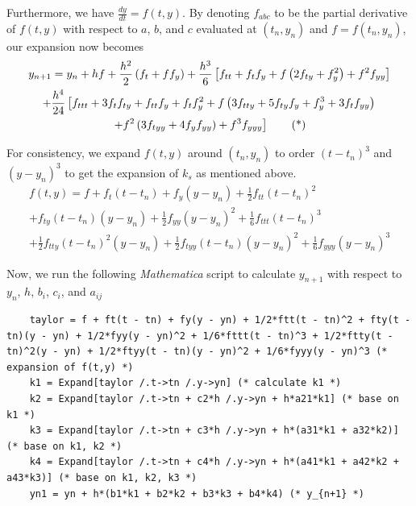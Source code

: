 \documentclass[a4paper]{article}
\numberwithin{equation}{section}
\begin{document}
Furthermore, we have \(\frac{dy}{dt} = f(t,y)\). By denoting \(f_{abc}\) to be the partial derivative of \(f(t,y)\) with respect to \(a\), \(b\), and \(c\) evaluated at \((t_n, y_n)\) and \(f = f(t_n, y_n)\), our expansion now becomes
\begin{multline*}
  y_{n+1} = y_n + hf + \frac{h^2}{2}\left(f_t + f f_y\right) + \frac{h^3}{6}\left[f_{tt} + f_t f_y + f\left(2f_{ty} + f_y^2\right) + f^2 f_{yy}\right] \\
  + \frac{h^4}{24}\left[f_{ttt} + 3f_t f_{ty} + f_{tt} f_y + f_t f_y^2 + f\left(3f_{tty} + 5f_{ty} f_y + f_y^3 + 3f_t f_{yy}\right)\right.     \\
    \left.+ f^2\left(3f_{tyy} + 4f_y f_{yy}\right) + f^3 f_{yyy}\vphantom{f_y^3}\right] \tag{*}
\end{multline*}

For consistency, we expand \(f(t,y)\) around \((t_n, y_n)\) to order \({(t-t_n)}^3\) and \({(y-y_n)}^3\) to get the expansion of \(k_s\) as mentioned above.
\begin{multline*}
  f(t,y) = f + f_t(t-t_n) + f_y(y-y_n) + \frac{1}{2}f_{tt}{(t-t_n)}^2 \\
  + f_{ty}(t-t_n)(y-y_n) + \frac{1}{2}f_{yy}{(y-y_n)}^2 + \frac{1}{6}f_{ttt}{(t-t_n)}^3 \\
  + \frac{1}{2}f_{tty}{(t-t_n)}^2(y-y_n) + \frac{1}{2}f_{tyy}(t-t_n){(y-y_n)}^2 + \frac{1}{6}f_{yyy}{(y-y_n)}^3
\end{multline*}

Now, we run the following \textit{Mathematica} script to calculate \(y_{n+1}\) with respect to \(y_n\), \(h\), \(b_i\), \(c_i\), and \(a_{ij}\)
\begin{mdframed}[leftline=false,rightline=false,backgroundcolor=magenta!10,nobreak=true]
  \begin{verbatim}
    taylor = f + ft(t - tn) + fy(y - yn) + 1/2*ftt(t - tn)^2 + fty(t - tn)(y - yn) + 1/2*fyy(y - yn)^2 + 1/6*fttt(t - tn)^3 + 1/2*ftty(t - tn)^2(y - yn) + 1/2*ftyy(t - tn)(y - yn)^2 + 1/6*fyyy(y - yn)^3 (* expansion of f(t,y) *)
    k1 = Expand[taylor /.t->tn /.y->yn] (* calculate k1 *)
    k2 = Expand[taylor /.t->tn + c2*h /.y->yn + h*a21*k1] (* base on k1 *)
    k3 = Expand[taylor /.t->tn + c3*h /.y->yn + h*(a31*k1 + a32*k2)] (* base on k1, k2 *)
    k4 = Expand[taylor /.t->tn + c4*h /.y->yn + h*(a41*k1 + a42*k2 + a43*k3)] (* base on k1, k2, k3 *)
    yn1 = yn + h*(b1*k1 + b2*k2 + b3*k3 + b4*k4) (* y_{n+1} *)
  \end{verbatim}
\end{mdframed}
\end{document}
